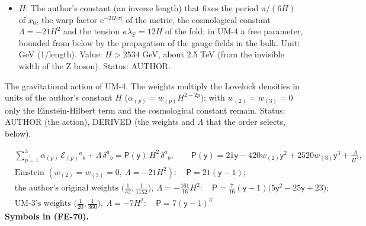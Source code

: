 \documentclass[
  10pt,
]{article}
\begin{document}
\begin{itemize}
  action, \(w_{(1)} = 1\) and \(w_{(2)}\), \(w_{(3)}\) of the
  Gauss-Bonnet and the cubic densities. UM-4 sets
  \(w_{(2)} = w_{(3)} = 0\) (Einstein gravity): the only weights for
  which gravitons propagate on the light cone on every background, not
  only around the static block. The author's original weights
  \(w_{(2)} = 1/32\), \(w_{(3)} = 1/1152\)
  (Dirac\_Einstein-Lovelock\_4+4\_Nash.nb, In{[}134{]}) keep the
  gravitons on the light cone only around the static block (with
  \(\Lambda = -161H^2/16\)); UM-3 used \((1, 1/20, 1/360)\). Unit:
  dimensionless. Value: \((1, 0, 0)\) in UM-4; the author's original
  \((1, 1/32, 1/1152)\). Status: AUTHOR (the form), DERIVED (the values
  that the order of 2026-10-25 selects).
\item
  \(H\): The author's constant (an inverse length) that fixes the period
  \(\pi/(6H)\) of \(x_0\), the warp factor
  \(\mathrm{e}^{-2H\lvert\sigma\rvert}\) of the metric, the cosmological
  constant \(\Lambda = -21H^2\) and the tension
  \(\kappa\lambda_{\mathrm{F}} = 12H\) of the fold; in UM-4 a free
  parameter, bounded from below by the propagation of the gauge fields
  in the bulk. Unit: GeV (1/length). Value: \(H > 2534\) GeV, about 2.5
  TeV (from the invisible width of the Z boson). Status: AUTHOR.
\end{itemize}

The gravitational action of UM-4. The weights multiply the Lovelock
densities in units of the author's constant \(H\)
(\(\alpha_{(p)} = w_{(p)}H^{2-2p}\)); with \(w_{(2)} = w_{(3)} = 0\)
only the Einstein-Hilbert term and the cosmological constant remain.
Status: AUTHOR (the action), DERIVED (the weights and \(\Lambda\) that
the order selects, below).

\[
\begin{aligned}
&\sum_{p=1}^{3}\alpha_{(p)}\,\mathcal{E}_{(p)}{}^a{}_b + \Lambda\,\delta^a{}_b = \mathsf{P}(\mathsf{y})\,H^2\,\delta^a{}_b,\qquad
 \mathsf{P}(\mathsf{y}) = 21\mathsf{y} - 420w_{(2)}\mathsf{y}^2 + 2520w_{(3)}\mathsf{y}^3 + \frac{\Lambda}{H^2},\\
&\text{Einstein } (w_{(2)} = w_{(3)} = 0,\ \Lambda = -21H^2):\quad \mathsf{P} = 21(\mathsf{y} - 1);\\
&\text{the author's original weights } \Big(\frac{1}{32}, \frac{1}{1152}\Big),\ \Lambda = -\frac{161}{16}H^2:\quad
 \mathsf{P} = \frac{7}{16}(\mathsf{y} - 1)\big(5\mathsf{y}^2 - 25\mathsf{y} + 23\big);\\
&\text{UM-3's weights } \Big(\frac{1}{20}, \frac{1}{360}\Big),\ \Lambda = -7H^2:\quad \mathsf{P} = 7(\mathsf{y} - 1)^3
\end{aligned} \tag{FE-70}
\] \textbf{Symbols in (FE-70).}
\end{document}
